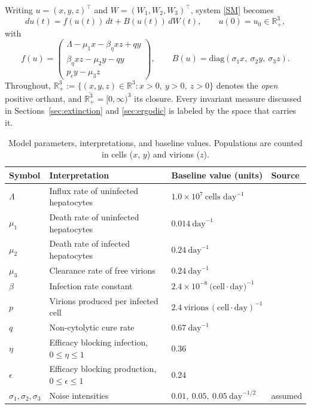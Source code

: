 \documentclass{article}
\newcommand{\betaeta}{\beta_\eta}
\newcommand{\peps}{p_\epsilon}
\begin{document}
Writing $u=(x,y,z)^\top$ and $W=(W_1,W_2,W_3)^\top$, system \eqref{SM} becomes
\begin{equation}\label{SM1}
du(t) = f(u(t))\,dt + B(u(t))\,dW(t), \qquad u(0)=u_0 \in \mathbb{R}^3_{+},
\end{equation}
with
\[
f(u) =
\begin{pmatrix}
\Lambda - \mu_1 x - \betaeta xz + qy \\
\betaeta xz - \mu_2 y - qy \\
\peps y - \mu_3 z
\end{pmatrix}, \qquad
B(u) = \mathrm{diag}(\sigma_1 x,\ \sigma_2 y,\ \sigma_3 z).
\]
Throughout, $\mathbb{R}^3_+:=\{(x,y,z)\in\mathbb{R}^3:x>0,\ y>0,\ z>0\}$ denotes the \emph{open} positive orthant, and $\overline{\mathbb{R}^3_+}=[0,\infty)^3$ its closure. Every invariant measure discussed in Sections~\ref{sec:extinction} and \ref{sec:ergodic} is labeled by the space that carries it.

\begin{table}[H]
\centering
\caption{Model parameters, interpretations, and baseline values. Populations are counted in cells ($x$, $y$) and virions ($z$).}
\small
\begin{tabular}{llll}
\toprule
\textbf{Symbol} & \textbf{Interpretation} & \textbf{Baseline value (units)} & \textbf{Source} \\
\midrule
$\Lambda$ & Influx rate of uninfected hepatocytes & $1.0 \times 10^{7}\ \text{cells day}^{-1}$ & \cite{Ref0} \\
$\mu_1$   & Death rate of uninfected hepatocytes & $0.014\ \text{day}^{-1}$ & \cite{Ref12} \\
$\mu_2$   & Death rate of infected hepatocytes   & $0.24\ \text{day}^{-1}$  & \cite{Ref13} \\
$\mu_3$   & Clearance rate of free virions       & $0.24\ \text{day}^{-1}$  & \cite{Ref0} \\
$\beta$   & Infection rate constant              & $2.4 \times 10^{-8}\ \text{(cell}\cdot\text{day)}^{-1}$ & \cite{Ref0} \\
$p$       & Virions produced per infected cell   & $2.4\ \text{virions}\,(\text{cell}\cdot\text{day})^{-1}$ & \cite{Ref0} \\
$q$       & Non-cytolytic cure rate              & $0.67\ \text{day}^{-1}$  & \cite{Ref12} \\
$\eta$    & Efficacy blocking infection, $0\le\eta\le1$ & $0.36$ & \cite{Ref13} \\
$\epsilon$& Efficacy blocking production, $0\le\epsilon\le1$ & $0.24$ & \cite{Ref13} \\
$\sigma_1,\sigma_2,\sigma_3$ & Noise intensities & $0.01,\ 0.05,\ 0.05\ \text{day}^{-1/2}$ & assumed \\
\bottomrule
\end{tabular}
\label{T1}
\end{table}
\end{document}
